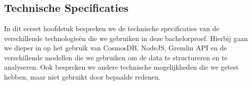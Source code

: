 \chapter{}%
\label{ch:stand-van-zaken}






\section{Technische Specificaties}
In dit eerset hoofdstuk bespreken we de technische specificaties van de verschillende technologieën die we gebruiken in deze bachelorproef.
Hierbij gaan we dieper in op het gebruik van CosmosDB, NodeJS, Gremlin API en de verschillende modellen die we gebruiken om de data te structureren en te analyseren.
Ook bespreken we andere technische mogelijkheden die we getest hebben, maar niet gebruikt door bepaalde redenen. 


